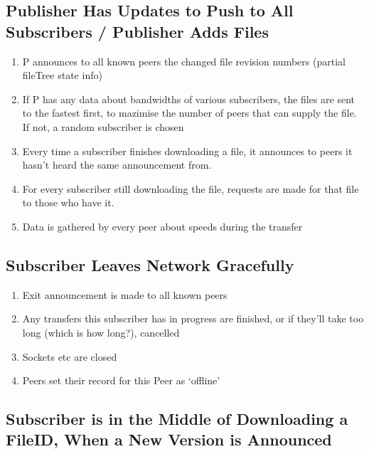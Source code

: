 \documentclass[12pt,a4paper,]{adreport}
\begin{document}
\subsection{Publisher Has Updates to Push to All Subscribers / Publisher
Adds
Files}\label{publisher-has-updates-to-push-to-all-subscribers-publisher-adds-files}

\begin{enumerate}
\def\labelenumi{\arabic{enumi}.}
\itemsep1pt\parskip0pt
\item
  P announces to all known peers the changed file revision numbers
  (partial fileTree state info)
\item
  If P has any data about bandwidths of various subscribers, the files
  are sent to the fastest first, to mazimise the number of peers that
  can supply the file. If not, a random subscriber is chosen
\item
  Every time a subscriber finishes downloading a file, it announces to
  peers it hasn't heard the same announcement from.
\item
  For every subscriber still downloading the file, requests are made for
  that file to those who have it.
\item
  Data is gathered by every peer about speeds during the transfer
\end{enumerate}

\subsection{Subscriber Leaves Network
Gracefully}\label{subscriber-leaves-network-gracefully}

\begin{enumerate}
\def\labelenumi{\arabic{enumi}.}
\itemsep1pt\parskip0pt
\item
  Exit announcement is made to all known peers
\item
  Any transfers this subscriber has in progress are finished, or if
  they'll take too long (which is how long?), cancelled
\item
  Sockets etc are closed
\item
  Peers set their record for this Peer as `offline'
\end{enumerate}

\subsection{Subscriber is in the Middle of Downloading a FileID, When a
New Version is
Announced}\label{subscriber-is-in-the-middle-of-downloading-a-fileid-when-a-new-version-is-announced}
\end{document}
